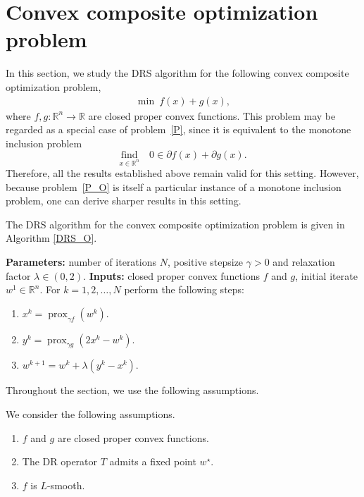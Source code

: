 \documentclass[ijoc,sglanonrev]{informs4}
\begin{document}
\section{Convex composite optimization problem} \label{Comp_S}

In this section, we study the DRS algorithm for the following convex composite optimization problem,
\begin{align}\label{P_O}
   \min\ f(x)+g(x),  
\end{align}
where $f, g:\mathbb{R}^n\to\mathbb{R}$ are closed proper convex functions. This problem may be regarded as a special case of problem~\eqref{P}, since it is equivalent to the monotone inclusion problem 
$$
\underset{x\in\mathbb{R}^n}{\text{find}}\quad 0 \in \partial f(x) + \partial g(x).
$$
Therefore, all the results established above remain valid for this setting. However, because problem~\eqref{P_O} is itself a particular instance of a monotone inclusion problem, one can derive sharper results in this setting.

The DRS algorithm for the convex composite optimization problem is given in Algorithm \ref{DRS_O}. 

\begin{algorithm}
\caption{The DRS algorithm for the composite optimization problem}
\begin{algorithmic}
\State \textbf{Parameters:} number of iterations $N$,  positive stepsize $\gamma>0$ and relaxation factor $\lambda\in (0, 2)$.
\State \textbf{Inputs:} closed proper convex functions $f$ and $g$, initial iterate $w^1 \in \mathbb{R}^n$.
\State For $k=1, 2, \ldots, N$ perform the following steps:\\
\begin{enumerate}[label=\roman*)]
\item 
$x^k = \operatorname{prox}_{\gamma f}(w^k)$.
\item
$y^k = \operatorname{prox}_{\gamma g}(2x^k - w^k)$.
\item
$w^{k+1} = w^k + \lambda (y^k - x^k)$.
\end{enumerate}
\end{algorithmic}
\label{DRS_O}
\end{algorithm}

 Throughout the section, we use the following assumptions. 
 
\begin{assumption}\label{assumption2}
We consider the following assumptions.
\begin{enumerate}[label=\roman*)]
    \item 
    $f$ and $g$ are closed proper convex functions.
    \item 
  The DR operator $T$ admits a fixed point \(w^\star\).
    \item 
    $f$ is $L$-smooth.
\end{enumerate}
\end{assumption}
\end{document}
